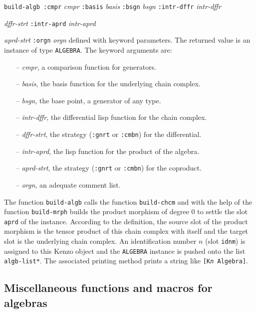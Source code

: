 \vskip 0.40cm
{\tt build-algb :cmpr} {\em cmpr} {\tt :basis} {\em basis} {\tt :bsgn} {\em bsgn} {\tt :intr-dffr} {\em intr-dffr}\par
\hspace*{22.5mm}{\tt :dffr-strt} {\em dffr-strt} {\tt :intr-aprd} {\em intr-aprd} \par
\hspace*{22.5mm}{\tt :aprd-strt} {\em aprd-strt} {\tt :orgn} {\em orgn}
\vskip 0.40cm
defined with keyword parameters. The returned value is an instance of type {\tt ALGEBRA}. 
The keyword arguments are:
\begin{itemize}
\item[--] {\em cmpr}, a comparison function for generators.
\item[--] {\em basis}, the basis function for the underlying chain complex.
\item[--] {\em bsgn}, the  base point, a generator of any type.
\item[--] {\em intr-dffr}, the differential lisp function for the chain complex.
\item[--] {\em dffr-strt}, the strategy ({\tt :gnrt} or {\tt :cmbn}) for the differential.
\item[--] {\em intr-aprd}, the lisp function for the product of the algebra.
\item[--] {\em aprd-strt}, the strategy ({\tt :gnrt} or {\tt :cmbn}) for the coproduct.
\item[--] {\em orgn}, an adequate comment list.
\end{itemize}
The function {\tt build-algb} calls  the function {\tt build-chcm} and with the help of the function
{\tt build-mrph} builds the product morphism of degree $0$ to settle the
slot {\tt aprd} of the instance. According to
the definition, the source slot of the product morphism 
is the tensor product of this chain complex with itself 
and the target slot is the underlying chain complex.
An identification number $n$ (slot {\tt idnm}) is assigned to this Kenzo object 
and the {\tt ALGEBRA} instance is  pushed  onto the list {\tt *algb-list*}. 
The  associated printing method prints a string like 
{\tt [K{\em n} Algebra]}.

\newpage

\subsection {Miscellaneous functions and macros for algebras}

